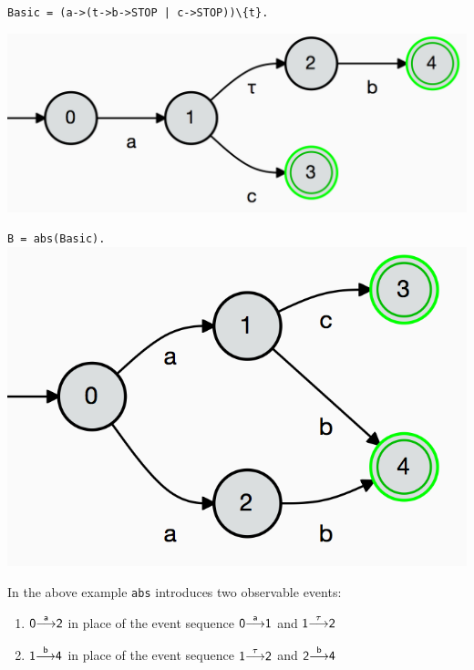 \documentclass[]{article}
\begin{document}
\begin{minipage}{0.45\textwidth}
\noindent\begin{center}\verb$Basic = (a->(t->b->STOP | c->STOP))\{t}.$

 \includegraphics[scale=0.4]{BasicTau.png} 
 \end{center} 
 \end{minipage}\hspace{\fill}
\begin{minipage}{0.45\textwidth}
\noindent\begin{center}
\verb$B = abs(Basic).$
 \includegraphics[scale=0.6]{Basic.png} 
 \end{center} 
 \end{minipage}
 
 In the above example \verb|abs| introduces two observable events:
\begin{center} 
 \begin{minipage}{0.7\textwidth}
 \begin{enumerate}
 \item ${\sf {0}{\stackrel{a}{\longrightarrow}}{2} }$  in place of  the event sequence ${\sf {0}{\stackrel{a}{\longrightarrow}}{1} }$  and  ${\sf {1}{\stackrel{\tau}{\longrightarrow}}{2} } $ 
 \item ${\sf {1}{\stackrel{b}{\longrightarrow}}{4} }$  in place of  the event sequence ${\sf {1}{\stackrel{\tau}{\longrightarrow}}{2} }$  and  ${\sf {2}{\stackrel{b}{\longrightarrow}}{4} } $ 
 \end{enumerate} 
   \end{minipage}
 \end{center} 
  
\end{document}
